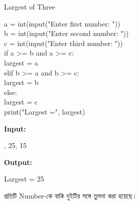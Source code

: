 \begin{codeoutputbox}{Largest of Three}

\noindent
\begin{minipage}[t]{0.59\linewidth}
\codeheading

\begin{english}
\ttfamily
a = int(input("Enter first number: "))\\
b = int(input("Enter second number: "))\\
c = int(input("Enter third number: "))\\[0.5mm]
if a >= b and a >= c:\\
\hspace*{4mm}largest = a\\
elif b >= a and b >= c:\\
\hspace*{4mm}largest = b\\
else:\\
\hspace*{4mm}largest = c\\[0.5mm]
print("Largest =", largest)
\end{english}

\end{minipage}
\hfill
\begin{minipage}[t]{0.37\linewidth}
\outputheading

\textbf{Input:}

\textenglish{, 25, 15}

\medskip

\textbf{Output:}

\textenglish{\ttfamily Largest = 25}

\medskip

প্রতিটি Number-কে বাকি দুইটির সঙ্গে তুলনা করা হয়েছে।

\end{minipage}

\end{codeoutputbox}



